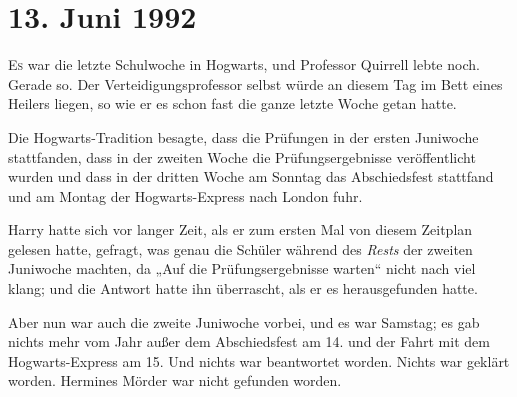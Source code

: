 
\section{13. Juni 1992}

\lettrine{E}{s} war die letzte Schulwoche in Hogwarts, und Professor Quirrell lebte noch. Gerade so. Der Verteidigungsprofessor selbst würde an diesem Tag im Bett eines Heilers liegen, so wie er es schon fast die ganze letzte Woche getan hatte.

Die Hogwarts-Tradition besagte, dass die Prüfungen in der ersten Juniwoche stattfanden, dass in der zweiten Woche die Prüfungsergebnisse veröffentlicht wurden und dass in der dritten Woche am Sonntag das Abschiedsfest stattfand und am Montag der Hogwarts-Express nach London fuhr.

Harry hatte sich vor langer Zeit, als er zum ersten Mal von diesem Zeitplan gelesen hatte, gefragt, was genau die Schüler während des \emph{Rests} der zweiten Juniwoche machten, da „Auf die Prüfungsergebnisse warten“ nicht nach viel klang; und die Antwort hatte ihn überrascht, als er es herausgefunden hatte.


Aber nun war auch die zweite Juniwoche vorbei, und es war Samstag; es gab nichts mehr vom Jahr außer dem Abschiedsfest am 14. und der Fahrt mit dem Hogwarts-Express am 15. Und nichts war beantwortet worden. Nichts war geklärt worden. Hermines Mörder war nicht gefunden worden.

